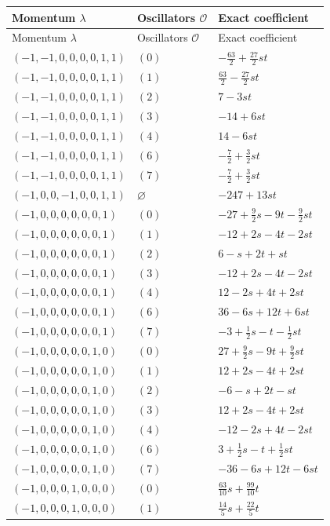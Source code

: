 \begingroup\scriptsize
\setlength{\tabcolsep}{5pt}
\begin{longtable}{@{}lll@{}}
\toprule
Momentum $\lambda$ & Oscillators $\mathcal O$ & Exact coefficient\\
\midrule\endfirsthead
\toprule
Momentum $\lambda$ & Oscillators $\mathcal O$ & Exact coefficient\\
\midrule\endhead
\bottomrule\endfoot
$(-1,-1,0,0,0,0,1,1)$ & $(0)$ & $-\frac{63}{2}+\frac{27}{2}st$\\
$(-1,-1,0,0,0,0,1,1)$ & $(1)$ & $\frac{63}{2}-\frac{27}{2}st$\\
$(-1,-1,0,0,0,0,1,1)$ & $(2)$ & $7-3st$\\
$(-1,-1,0,0,0,0,1,1)$ & $(3)$ & $-14+6st$\\
$(-1,-1,0,0,0,0,1,1)$ & $(4)$ & $14-6st$\\
$(-1,-1,0,0,0,0,1,1)$ & $(6)$ & $-\frac{7}{2}+\frac{3}{2}st$\\
$(-1,-1,0,0,0,0,1,1)$ & $(7)$ & $-\frac{7}{2}+\frac{3}{2}st$\\
$(-1,0,0,-1,0,0,1,1)$ & $\varnothing$ & $-247+13st$\\
$(-1,0,0,0,0,0,0,1)$ & $(0)$ & $-27+\frac{9}{2}s-9t-\frac{9}{2}st$\\
$(-1,0,0,0,0,0,0,1)$ & $(1)$ & $-12+2s-4t-2st$\\
$(-1,0,0,0,0,0,0,1)$ & $(2)$ & $6-s+2t+st$\\
$(-1,0,0,0,0,0,0,1)$ & $(3)$ & $-12+2s-4t-2st$\\
$(-1,0,0,0,0,0,0,1)$ & $(4)$ & $12-2s+4t+2st$\\
$(-1,0,0,0,0,0,0,1)$ & $(6)$ & $36-6s+12t+6st$\\
$(-1,0,0,0,0,0,0,1)$ & $(7)$ & $-3+\frac{1}{2}s-t-\frac{1}{2}st$\\
$(-1,0,0,0,0,0,1,0)$ & $(0)$ & $27+\frac{9}{2}s-9t+\frac{9}{2}st$\\
$(-1,0,0,0,0,0,1,0)$ & $(1)$ & $12+2s-4t+2st$\\
$(-1,0,0,0,0,0,1,0)$ & $(2)$ & $-6-s+2t-st$\\
$(-1,0,0,0,0,0,1,0)$ & $(3)$ & $12+2s-4t+2st$\\
$(-1,0,0,0,0,0,1,0)$ & $(4)$ & $-12-2s+4t-2st$\\
$(-1,0,0,0,0,0,1,0)$ & $(6)$ & $3+\frac{1}{2}s-t+\frac{1}{2}st$\\
$(-1,0,0,0,0,0,1,0)$ & $(7)$ & $-36-6s+12t-6st$\\
$(-1,0,0,0,1,0,0,0)$ & $(0)$ & $\frac{63}{10}s+\frac{99}{10}t$\\
$(-1,0,0,0,1,0,0,0)$ & $(1)$ & $\frac{14}{5}s+\frac{22}{5}t$\\

\end{longtable}
